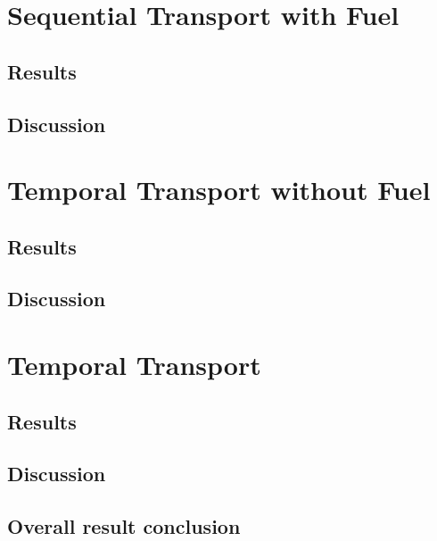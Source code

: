 \section{Sequential Transport with Fuel}

\subsection{Results}

\subsection{Discussion}

\section{Temporal Transport without Fuel}

\subsection{Results}

\subsection{Discussion}

\section{Temporal Transport}

\subsection{Results}

\subsection{Discussion}

\subsection{Overall result conclusion}
